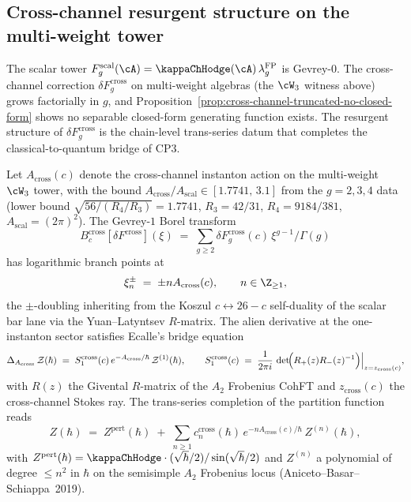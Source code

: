 \subsection{Cross-channel resurgent structure on the multi-weight tower}
\label{subsec:cross-channel-resurgence}

The scalar tower $F_g^{\mathrm{scal}}(\cA) = \kappaChHodge(\cA)\,\lambda_g^{\mathrm{FP}}$
is Gevrey-$0$. The cross-channel correction
$\delta F_g^{\mathrm{cross}}$ on multi-weight algebras (the $\cW_3$
witness above) grows factorially in $g$, and Proposition~\ref{prop:cross-channel-truncated-no-closed-form}
shows no separable closed-form generating function exists. The
resurgent structure of $\delta F_g^{\mathrm{cross}}$ is the chain-level
trans-series datum that completes the
classical-to-quantum bridge of CP3.

\begin{theorem}
\label{thm:cross-channel-resurgent-structure}
Let $A_{\mathrm{cross}}(c)$ denote the cross-channel instanton action
on the multi-weight $\cW_3$ tower, with the bound
$A_{\mathrm{cross}} / A_{\mathrm{scal}} \in [1.7741,\, 3.1]$ from the
$g = 2, 3, 4$ data \textup{(}lower bound $\sqrt{56/(R_4/R_3)} = 1.7741$,
$R_3 = 42/31$, $R_4 = 9184/381$, $A_{\mathrm{scal}} = (2\pi)^2$\textup{)}.
The Gevrey-$1$ Borel transform
\[
 B^{\mathrm{cross}}_c[\delta F^{\mathrm{cross}}](\xi)
 \;=\;
 \sum_{g \ge 2} \delta F_g^{\mathrm{cross}}(c)\, \xi^{g - 1}/\Gamma(g)
\]
has logarithmic branch points at
\[
 \xi_n^{\pm} \;=\; \pm n A_{\mathrm{cross}}(c),
\qquad n \in \Z_{\ge 1},
\]
the $\pm$-doubling inheriting from the Koszul $c \leftrightarrow 26 - c$
self-duality of the scalar bar lane via the Yuan--Latyntsev
$R$-matrix. The alien derivative at the one-instanton sector
satisfies Ecalle's bridge equation
\[
 \Delta_{A_{\mathrm{cross}}}\,\mathcal Z(\hbar)
 \;=\;
 S_1^{\mathrm{cross}}(c)\,
 e^{-A_{\mathrm{cross}}/\hbar}\,
 \mathcal Z^{(1)}(\hbar),
\qquad
 S_1^{\mathrm{cross}}(c)
 \;=\;
 \frac{1}{2 \pi i}\,
 \det\!\Bigl( R_+(z) R_-(z)^{-1} \Bigr)\Big|_{z = z_{\mathrm{cross}}(c)},
\]
with $R(z)$ the Givental $R$-matrix of the $A_2$ Frobenius CohFT
and $z_{\mathrm{cross}}(c)$ the cross-channel Stokes ray. The
trans-series completion of the partition function reads
\[
 Z(\hbar)
 \;=\;
 Z^{\mathrm{pert}}(\hbar)
 \;+\;
 \sum_{n \ge 1}
  c_n^{\mathrm{cross}}(\hbar)\,
  e^{-n A_{\mathrm{cross}}(c)/\hbar}\,
  Z^{(n)}(\hbar),
\]
with $Z^{\mathrm{pert}}(\hbar) = \kappaChHodge \cdot
(\sqrt\hbar/2)/\sin(\sqrt\hbar/2)$ and $Z^{(n)}$ a polynomial of degree
$\le n^2$ in $\hbar$ on the semisimple $A_2$ Frobenius locus
\textup{(}Aniceto--Basar--Schiappa~2019\textup{)}.
\end{theorem}

